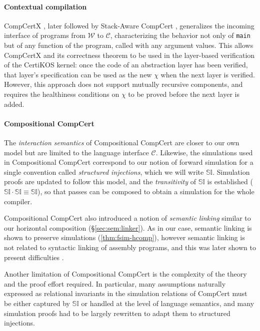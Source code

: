 \documentclass[sigplan,screen]{acmart}
\begin{document}
\paragraph{Contextual compilation} %

CompCertX \cite{popl15},
later followed by Stack-Aware CompCert \cite{stackaware},
generalizes
the incoming interface of programs
from $\mathcal{W}$ to $\mathcal{C}$,
characterizing the behavior
not only of \texttt{main}
but of any function of the program,
called with any argument values.
This allows CompCertX and its correctness theorem
to be used in the layer-based verification of
the CertiKOS kernel:
once the code of an abstraction layer has been verified,
that layer's specification can be used as the new $\chi$
when the next layer is verified.
However,
this approach does not support
mutually recursive components,
and requires the healthiness conditions on $\chi$
to be proved before the next layer is added.


\paragraph{Compositional CompCert} %

The \emph{interaction semantics} of
Compositional CompCert \cite{compcompcert}
are closer to our own model
but are limited to the language interface $\mathcal{C}$.
Likewise, the simulations used in Compositional CompCert
correspond to our notion of forward simulation
for a single convention called \emph{structured injections},
which we will write $\mathbb{SI}$.
Simulation proofs are updated to follow this model,
and the \emph{transitivity} of $\mathbb{SI}$ is established
($\mathbb{SI} \cdot \mathbb{SI} \equiv \mathbb{SI}$),
so that passes can be composed
to obtain a simulation for the whole compiler.

Compositional CompCert also introduced a notion of \emph{semantic linking}
similar to our horizontal composition
(\S\ref{sec:sem:linker}).
As in our case,
semantic linking is shown to preserve simulations
(\autoref{thm:fsim-hcomp}),
however semantic linking is not related to
syntactic linking of assembly programs,
and this was later shown to present difficulties \cite{compcertm}.

Another limitation of Compositional CompCert
is the complexity of the theory
and the proof effort required.
In particular,
many assumptions naturally expressed as
relational invariants in the simulation relations of CompCert
must be either captured by $\mathbb{SI}$
or handled at the level of language semantics,
and many simulation proofs
had to be largely rewritten to adapt them to
structured injections.
\end{document}
